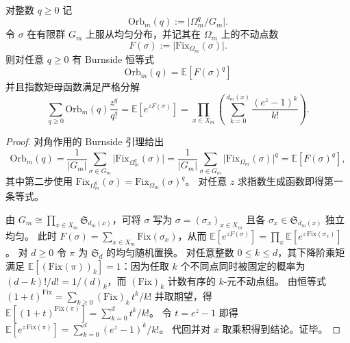 \begin{theorem}\label{thm:op-algebra-fold-orbit-mgf-fiber-factorization}
对整数 \(q\ge 0\) 记
\[
\mathrm{Orb}_m(q):=\bigl|\Omega_m^q/G_m\bigr|.
\]
令 \(\sigma\) 在有限群 \(G_m\) 上服从均匀分布，并记其在 \(\Omega_m\) 上的不动点数
\[
F(\sigma):=\bigl|\mathrm{Fix}_{\Omega_m}(\sigma)\bigr|.
\]
则对任意 \(q\ge 0\) 有 Burnside 恒等式
\[
\boxed{\;\mathrm{Orb}_m(q)=\mathbb E\!\left[F(\sigma)^q\right]\;}
\]
并且指数矩母函数满足严格分解
\[
\sum_{q\ge 0}\mathrm{Orb}_m(q)\frac{z^q}{q!}
=\mathbb E[e^{zF(\sigma)}]
=\prod_{x\in X_m}\left(\sum_{k=0}^{d_m(x)}\frac{(e^{z}-1)^k}{k!}\right).
\]
\end{theorem}
\begin{proof}
对角作用的 Burnside 引理给出
\[
\mathrm{Orb}_m(q)
=\frac{1}{|G_m|}\sum_{\sigma\in G_m}\bigl|\mathrm{Fix}_{\Omega_m^q}(\sigma)\bigr|
=\frac{1}{|G_m|}\sum_{\sigma\in G_m}\bigl|\mathrm{Fix}_{\Omega_m}(\sigma)\bigr|^q
=\mathbb E[F(\sigma)^q],
\]
其中第二步使用 \(\mathrm{Fix}_{\Omega_m^q}(\sigma)=\mathrm{Fix}_{\Omega_m}(\sigma)^q\)。
对任意 \(z\) 求指数生成函数即得第一条等式。
\par
由 \(G_m\cong\prod_{x\in X_m}\mathfrak S_{d_m(x)}\)，可将 \(\sigma\) 写为 \(\sigma=(\sigma_x)_{x\in X_m}\) 且各 \(\sigma_x\in\mathfrak S_{d_m(x)}\) 独立均匀。
此时 \(F(\sigma)=\sum_{x\in X_m}\mathrm{Fix}(\sigma_x)\)，从而
\(
\mathbb E[e^{zF(\sigma)}]=\prod_x \mathbb E[e^{z\,\mathrm{Fix}(\sigma_x)}]
\)。
对 \(d\ge 0\) 令 \(\pi\) 为 \(\mathfrak S_d\) 的均匀随机置换。
对任意整数 \(0\le k\le d\)，其下降阶乘矩满足 \(\mathbb E[(\mathrm{Fix}(\pi))_k]=1\)：因为任取 \(k\) 个不同点同时被固定的概率为 \((d-k)!/d!=1/(d)_k\)，而 \((\mathrm{Fix})_k\) 计数有序的 \(k\)-元不动点组。
由恒等式
\(
(1+t)^{\mathrm{Fix}}=\sum_{k\ge 0}(\mathrm{Fix})_k\,t^k/k!
\)
并取期望，得 \(\mathbb E[(1+t)^{\mathrm{Fix}(\pi)}]=\sum_{k=0}^{d}t^k/k!\)。
令 \(t=e^{z}-1\) 即得
\(
\mathbb E[e^{z\,\mathrm{Fix}(\pi)}]=\sum_{k=0}^{d}(e^{z}-1)^k/k!
\)。
代回并对 \(x\) 取乘积得到结论。证毕。
\end{proof}

